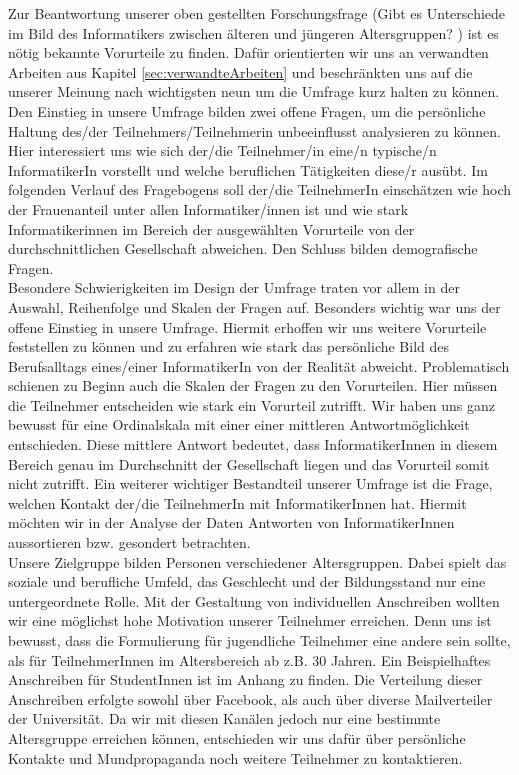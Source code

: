 \documentclass[de]{agse-empir-report}\usepackage[]{graphicx}\usepackage[]{color}
\begin{document}
Zur Beantwortung unserer oben gestellten Forschungsfrage (\glqq Gibt es Unterschiede im Bild des Informatikers zwischen älteren und jüngeren Altersgruppen? \grqq) ist es nötig bekannte Vorurteile zu finden. Dafür orientierten wir uns an verwandten Arbeiten aus Kapitel \ref{sec:verwandteArbeiten}  und beschränkten uns auf die unserer Meinung nach wichtigsten neun um die Umfrage kurz halten zu können. Den Einstieg in unsere Umfrage bilden zwei offene Fragen, um die persönliche Haltung des/der Teilnehmers/Teilnehmerin unbeeinflusst analysieren zu können. Hier interessiert uns wie sich der/die Teilnehmer/in eine/n typische/n InformatikerIn vorstellt und welche beruflichen Tätigkeiten diese/r ausübt. Im folgenden Verlauf des Fragebogens soll der/die TeilnehmerIn einschätzen wie hoch der Frauenanteil unter allen Informatiker/innen ist und wie stark Informatikerinnen im Bereich der ausgewählten Vorurteile von der durchschnittlichen Gesellschaft abweichen. Den Schluss bilden demografische Fragen. \\
Besondere Schwierigkeiten im Design der Umfrage traten vor allem in der Auswahl, Reihenfolge und Skalen der Fragen auf. Besonders wichtig war uns der offene Einstieg in unsere Umfrage. Hiermit erhoffen wir uns weitere Vorurteile feststellen zu können und zu erfahren wie stark das persönliche Bild des Berufsalltags eines/einer InformatikerIn von der Realität abweicht. Problematisch schienen zu Beginn auch die Skalen der Fragen zu den Vorurteilen. Hier müssen die Teilnehmer entscheiden wie stark ein Vorurteil zutrifft. Wir haben uns ganz bewusst für eine Ordinalskala mit einer einer mittleren Antwortmöglichkeit entschieden. Diese mittlere Antwort bedeutet, dass InformatikerInnen in diesem Bereich genau im Durchschnitt der Gesellschaft liegen und das Vorurteil somit nicht zutrifft. Ein weiterer wichtiger Bestandteil unserer Umfrage ist die Frage, welchen Kontakt der/die TeilnehmerIn mit InformatikerInnen hat. Hiermit möchten wir in der Analyse der Daten Antworten von InformatikerInnen aussortieren bzw. gesondert betrachten. \\
Unsere Zielgruppe bilden Personen verschiedener Altersgruppen. Dabei spielt das soziale und berufliche Umfeld, das Geschlecht und der Bildungsstand nur eine untergeordnete Rolle. Mit der Gestaltung von individuellen Anschreiben wollten wir eine möglichst hohe Motivation unserer Teilnehmer erreichen. Denn uns ist bewusst, dass die Formulierung für jugendliche Teilnehmer eine andere sein sollte, als für TeilnehmerInnen im Altersbereich ab z.B. 30 Jahren. Ein Beispielhaftes Anschreiben für StudentInnen ist im Anhang zu finden. Die Verteilung dieser Anschreiben erfolgte sowohl über Facebook, als auch über diverse Mailverteiler der Universität. Da wir mit diesen Kanälen jedoch nur eine bestimmte Altersgruppe erreichen können, entschieden wir uns dafür über persönliche Kontakte und Mundpropaganda noch weitere Teilnehmer zu kontaktieren.
\end{document}
